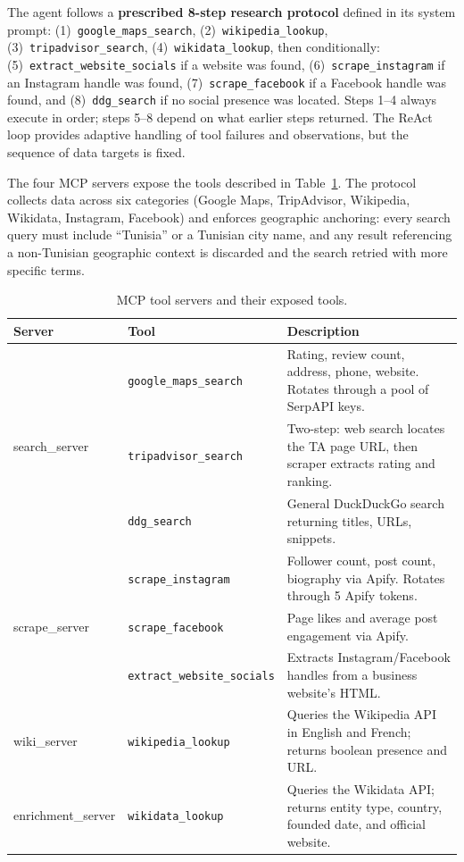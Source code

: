 The agent follows a \textbf{prescribed 8-step research protocol} defined in its
system prompt: (1)~\texttt{google\_maps\_search}, (2)~\texttt{wikipedia\_lookup},
(3)~\texttt{tripadvisor\_search}, (4)~\texttt{wikidata\_lookup}, then conditionally:
(5)~\texttt{extract\_website\_socials} if a website was found, (6)~\texttt{scrape\_instagram}
if an Instagram handle was found, (7)~\texttt{scrape\_facebook} if a Facebook handle
was found, and (8)~\texttt{ddg\_search} if no social presence was located. Steps 1--4
always execute in order; steps 5--8 depend on what earlier steps returned.
The ReAct loop provides adaptive handling of tool failures and observations, but the
sequence of data targets is fixed.

The four MCP servers expose the tools described in Table~\ref{tab:mcp_tools}. The
protocol collects data across six categories (Google Maps, TripAdvisor, Wikipedia,
Wikidata, Instagram, Facebook) and enforces geographic anchoring: every search query
must include ``Tunisia'' or a Tunisian city name, and any result referencing a
non-Tunisian geographic context is discarded and the search retried with more
specific terms.

\begin{table}[H]
\centering
\caption{MCP tool servers and their exposed tools.}
\label{tab:mcp_tools}
\begin{tabular}{|p{2.5cm}|p{3.5cm}|p{7.2cm}|}
\hline
\textbf{Server} & \textbf{Tool} & \textbf{Description} \\
\hline
\multirow{3}{*}{search\_server}
  & \texttt{google\_maps\_search}      & Rating, review count, address, phone, website. Rotates through a pool of SerpAPI keys. \\
\cline{2-3}
  & \texttt{tripadvisor\_search}       & Two-step: web search locates the TA page URL, then scraper extracts rating and ranking. \\
\cline{2-3}
  & \texttt{ddg\_search}               & General DuckDuckGo search returning titles, URLs, snippets. \\
\hline
\multirow{3}{*}{scrape\_server}
  & \texttt{scrape\_instagram}         & Follower count, post count, biography via Apify. Rotates through 5 Apify tokens. \\
\cline{2-3}
  & \texttt{scrape\_facebook}          & Page likes and average post engagement via Apify. \\
\cline{2-3}
  & \texttt{extract\_website\_socials} & Extracts Instagram/Facebook handles from a business website's HTML. \\
\hline
wiki\_server
  & \texttt{wikipedia\_lookup}         & Queries the Wikipedia API in English and French; returns boolean presence and URL. \\
\hline
enrichment\_server
  & \texttt{wikidata\_lookup}          & Queries the Wikidata API; returns entity type, country, founded date, and official website. \\
\hline
\end{tabular}
\end{table}

